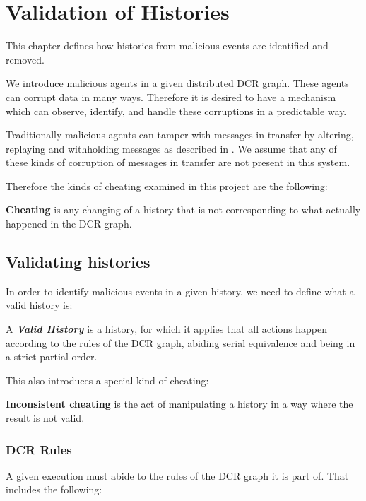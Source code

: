 \chapter{Validation of Histories}
\label{chap:consensusindcr}
	This chapter defines how histories from malicious events are identified and removed.
	
	\newpar We introduce malicious agents in a given distributed DCR graph. These agents can corrupt data in many ways. Therefore it is desired to have a mechanism which can observe, identify, and handle these corruptions in a predictable way. 
	
	Traditionally malicious agents can tamper with messages in transfer by altering, replaying and withholding messages as described in \cite{Coulouris:2011:DSC:2029110:chapter2}. We assume that any of these kinds of corruption of messages in transfer are not present in this system. 
	
	\newpar Therefore the kinds of cheating examined in this project are the following:
	\begin{definition}
		\textbf{Cheating} is any changing of a history that is not corresponding to what actually happened in the DCR graph.
	\end{definition}
	
	\section{Validating histories}
	In order to identify malicious events in a given history, we need to define what a valid history is:
	
		\begin{definition}
			A \textit{\textbf{Valid History}} is a history, for which it applies that all actions happen according to the rules of the DCR graph, abiding serial equivalence and being in a strict partial order. 
		\end{definition}
		
	This also introduces a special kind of cheating:
	
		\begin{definition}
			\textbf{Inconsistent cheating} is the act of manipulating a history in a way where the result is not valid.
		\end{definition}
		
	\subsection{DCR Rules}
	A given execution must abide to the rules of the DCR graph it is part of. That includes the following:
	
